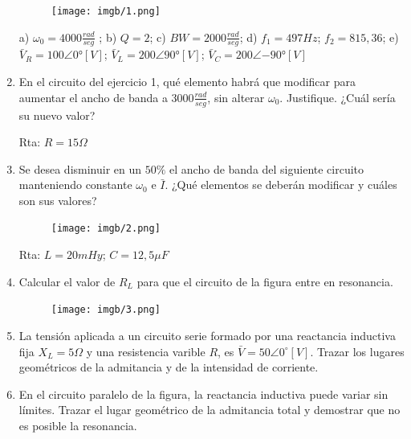 \documentclass[10pt,a4paper]{article}
\begin{document}
\begin{enumerate}
\begin{figure}[H]
	\centering
	\texttt{[image: imgb/1.png]}
	\label{e12}
\end{figure}

a) $\omega_0=4000 \frac{rad}{seg}$ ; b) $Q=2$; c) $BW=2000\frac{rad}{seg}$; d) $f_1=497Hz$; $f_2=815,36$; e) $\bar{V}_R=100\angle{0°}[V]$; $\bar{V}_L=200\angle{90°}[V]$; $\bar{V}_C=200\angle{-90°}[V]$

\item En el circuito del ejercicio 1, qué elemento habrá que modificar para aumentar el ancho de banda a $3000 \frac{rad}{seg}$, sin alterar $\omega_0$. Justifique. ¿Cuál sería su nuevo valor?

Rta: $R=15\Omega$

\item Se desea disminuir en un $50\%$ el ancho de banda del siguiente circuito manteniendo constante $\omega_{0}$ e $\bar{I}$. ¿Qué elementos se deberán modificar y cuáles son sus valores?

\begin{figure}[H]
	\centering
	\texttt{[image: imgb/2.png]}
	\label{e14}
\end{figure}

Rta: $L=20mHy$; $C=12,5\mu F$
\item Calcular el valor de $R_L$ para que el circuito de la figura entre en resonancia.

\begin{figure}[H]
	\centering
	\texttt{[image: imgb/3.png]}
	\label{e15}
\end{figure}


\item La tensión aplicada a un circuito serie formado por una reactancia inductiva fija $X_L=5\Omega$ y una resistencia varible $R$, es $\bar{V}=50\angle{0^{\circ}}[V]$. Trazar los lugares geométricos de la admitancia y de la intensidad de corriente.

\item En el circuito paralelo de la figura, la reactancia inductiva puede variar sin límites. Trazar el lugar geométrico de la admitancia total y demostrar que no es posible la resonancia.


\end{enumerate}
\end{document}
